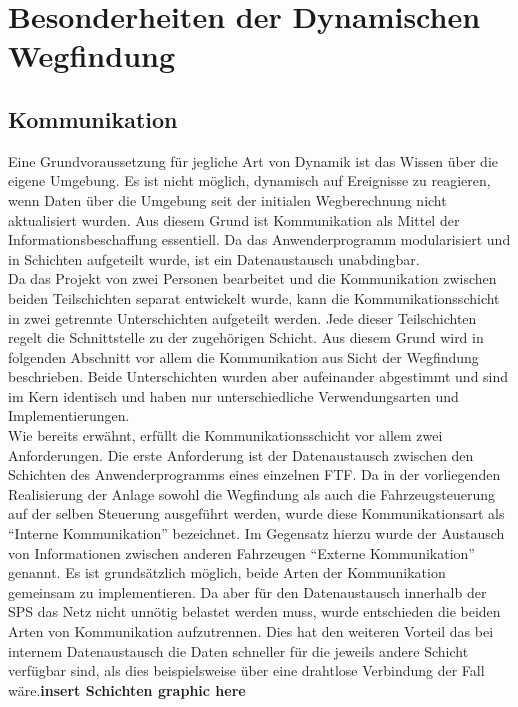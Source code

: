 \chapter{Besonderheiten der Dynamischen Wegfindung}

\section{Kommunikation}
	\label{Kommunikation}
	Eine Grundvoraussetzung für jegliche Art von Dynamik ist das Wissen über die eigene Umgebung. Es ist nicht möglich, dynamisch auf Ereignisse zu reagieren, wenn Daten über die Umgebung seit der initialen Wegberechnung nicht aktualisiert wurden. Aus diesem Grund ist Kommunikation als Mittel der Informationsbeschaffung essentiell. Da das Anwenderprogramm modularisiert und in Schichten aufgeteilt wurde, ist ein Datenaustausch unabdingbar. 
	\\
	Da das Projekt von zwei Personen bearbeitet und die Kommunikation zwischen beiden Teilschichten separat entwickelt wurde, kann die Kommunikationsschicht in zwei getrennte Unterschichten aufgeteilt werden. Jede dieser Teilschichten regelt die Schnittstelle zu der zugehörigen Schicht. Aus diesem Grund wird in folgenden Abschnitt vor allem die Kommunikation aus Sicht der Wegfindung beschrieben. Beide Unterschichten wurden aber aufeinander abgestimmt und sind im Kern identisch und haben nur unterschiedliche Verwendungsarten und Implementierungen.
	\\
	Wie bereits erwähnt, erfüllt die Kommunikationsschicht vor allem zwei Anforderungen. Die erste Anforderung ist der Datenaustausch zwischen den Schichten des Anwenderprogramms eines einzelnen \ac{FTF}. Da in der vorliegenden Realisierung der Anlage sowohl die Wegfindung als auch die Fahrzeugsteuerung auf der selben Steuerung ausgeführt werden, wurde diese Kommunikationsart als "`Interne Kommunikation"' bezeichnet. Im Gegensatz hierzu wurde der Austausch von Informationen zwischen anderen Fahrzeugen "`Externe Kommunikation"' genannt. Es ist grundsätzlich möglich, beide Arten der Kommunikation gemeinsam zu implementieren. Da aber für den Datenaustausch innerhalb der \ac{SPS} das Netz nicht unnötig belastet werden muss, wurde entschieden die beiden Arten von Kommunikation aufzutrennen. Dies hat den weiteren Vorteil das bei internem Datenaustausch die Daten schneller für die jeweils andere Schicht verfügbar sind, als dies beispielsweise über eine drahtlose Verbindung der Fall wäre.\textbf{insert Schichten graphic here}
	
